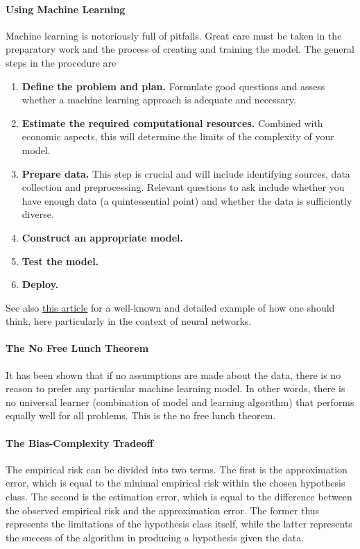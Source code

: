 \paragraph{Using Machine Learning}
Machine learning is notoriously full of pitfalls. Great care must be taken in the preparatory work and the process of creating and training the model. The general steps in the procedure are
\begin{enumerate}
	\item \textbf{Define the problem and plan.} Formulate good questions and assess whether a machine learning approach is adequate and necessary.
	\item \textbf{Estimate the required computational resources.} Combined with economic aspects, this will determine the limits of the complexity of your model.
	\item \textbf{Prepare data.} This step is crucial and will include identifying sources, data collection and preprocessing. Relevant questions to ask include whether you have enough data (a quintessential point) and whether the data is sufficiently diverse.
	\item \textbf{Construct an appropriate model.}
	\item \textbf{Test the model.}
	\item \textbf{Deploy.}
\end{enumerate}

See also \href{https://karpathy.github.io/2019/04/25/recipe/}{this article} for a well-known and detailed example of how one should think, here particularly in the context of neural networks.

\paragraph{The No Free Lunch Theorem}
It has been shown that if no assumptions are made about the data, there is no reason to prefer any particular machine learning model. In other words, there is no universal learner (combination of model and learning algorithm) that performs equally well for all problems. This is the no free lunch theorem.

\paragraph{The Bias-Complexity Tradeoff}
The empirical risk can be divided into two terms. The first is the approximation error, which is equal to the minimal empirical risk within the chosen hypothesis class. The second is the estimation error, which is equal to the difference between the observed empirical risk and the approximation error. The former thus represents the limitations of the hypothesis class itself, while the latter represents the success of the algorithm in producing a hypothesis given the data.

